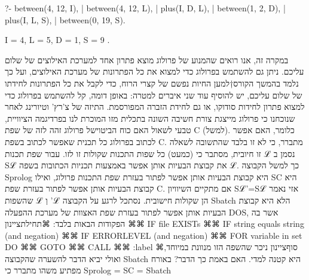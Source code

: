       ?- between(4, 12, I),
      | between(4, 12, L),
      | plus(I, D, L),
      | between(1, 2, D),
      | plus(I, L, S),
      | between(0, 19, S).

      I = 4,
      L = 5,
      D = 1,
      S = 9 .

      במקרה זה, אנו רואים שהמנוע של פרולוג מוצא פתרון אחד למערכת האילוצים של
      שלום עליכם. ניתן גם להשתמש בפרולוג כדי למצוא את כל הפתרונות של מערכת
      האילוצים, ועל
      כך נלמד בהמשך הקורס†{למען החיות נפשם של קצרי הרוח, כדי לקבל את כל הפתרונות לחידתו של שלום עליכם, יש להוסיף עוד שני איברים למטרה:}
      באופן דומה, קל להשתמש בפרולוג כדי למצוא
      פתרון לחידות סודוקו, או גם לחידת הזברה המפורסמת. התיזה של צ'רץ' וטיורינג
      לאחר שנוכחנו כי פרולוג מייצגת צורת חשיבה השונה בתכלית מזו המוכרת לנו
      בפרדיגמה הציוויית, טבעי לשאול האם כוח הביטוישל פרולוג זהה לזה של שפת C
      (למשל). כלומר,
      האם אפשר לכתוב בפרולוג כל תכנית שאפשר לכתוב בשפת C. מתברר, כי לא זו בלבד
      שהתשובה לשאלה זו חיובית, מסתבר כי (כמעט) כל שפות התכנות שקולות זו לזו. עבור
      שפת תכנות ℒ נסמן ב Sℒ את קבוצת הבעיות אותן אפשר באמצעות תכניות הכתובות
      בשפה ℒ. כך למשל הקבוצה Sprolog היא קבוצת הבעיות אותן אפשר לפתור בעזרת שפת
      התכנות פרולוג, ואילו SC היא קבוצת הבעיות אותן אפשר לפתור בעזרת שפת C. אם
      מתקיים השיוויון Sℒ'=Sℒ אזי נאמר שהשפות ℒ וְ 'ℒ הן שקולות חישובית.
      נסתכל לרגע על הקבוצה Sbatch הלא היא קבוצת הבעיות אותן אפשר לפתור בעזרת שפת האצוות של מערכת ההפעלה DOS, אשר בה הפקודות הבאות בלבד:
      ⌘תחילת{ציינון}
      ⌘⌘ IF file EXISTs
      ⌘⌘ IF string equals string (and negation)
      ⌘⌘ IF ERRORLEVEL (and negation)
      ⌘⌘ FOR variable in set DO
      ⌘⌘ GOTO
      ⌘⌘ CALL
      ⌘⌘ :label
    ⌘סוף{ציינון}
      ניכר שהשפה הזו מנוונת במיוחד, ואולי יביא הדבר להשערה שהקבוצה Sbatch היא
      קטנה למדי. האם באמת כך הדבר? באורח מפתיע משהו מתברר כי
      Sprolog = SC = Sbatch

